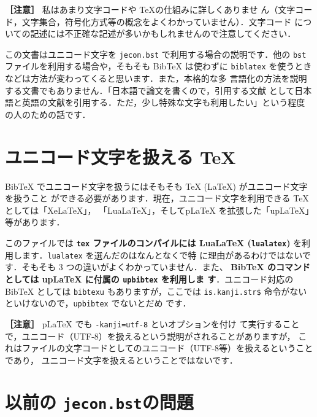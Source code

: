 \documentclass[article]{jlreq}
\begin{document}
\vspace*{1em}

\noindent \textbf{［注意］} 私はあまり文字コードや \TeX の仕組みに詳しくありませ
ん（文字コード，文字集合，符号化方式等の概念をよくわかっていません）．文字コード
についての記述には不正確な記述が多いかもしれませんので注意してください．

\vspace*{1em}

この文書はユニコード文字を \texttt{jecon.bst} で利用する場合の説明です．他の
\texttt{bst} ファイルを利用する場合や，そもそも BibTeX は使わずに
\texttt{biblatex} を使うときなどは方法が変わってくると思います．また，本格的な多
言語化の方法を説明する文書でもありません．「日本語で論文を書くので，引用する文献
として日本語と英語の文献を引用する．ただ，少し特殊な文字も利用したい」という程度
の人のための話です．


\section{ユニコード文字を扱える \TeX}

BibTeX でユニコード文字を扱うにはそもそも TeX (LaTeX) がユニコード文字を扱うこと
ができる必要があります．現在，ユニコード文字を利用できる TeX としては「XeLaTeX」，
「LuaLaTeX」，そしてpLaTeX を拡張した「upLaTeX」等があります．

このファイルでは \textbf{\texttt{tex} ファイルのコンパイルには LuaLaTeX
(\texttt{lualatex}) }を利用します．\texttt{lualatex} を選んだのはなんとなくで特
に理由があるわけではないです．そもそも 3 つの違いがよくわかっていません．また、
\textbf{BibTeX のコマンドとしては upLaTeX に付属の \texttt{upbibtex} を利用しま
す}．ユニコード対応の BibTeX としては \texttt{bibtexu} もありますが，ここでは
\texttt{is.kanji.str\$} 命令がないといけないので，\texttt{upbibtex} でないとだめ
です．

\vspace*{1em}

\noindent \textbf{［注意］} pLaTeX でも \verb|-kanji=utf-8| といオプションを付け
て実行することで，ユニコード（UTF-8）を扱えるという説明がされることがありますが，
これはファイルの文字コードとしてのユニコード（UTF-8等）を扱えるということであり，
ユニコード文字を扱えるということではないです．

\section{以前の \texttt{jecon.bst}の問題}
\label{jecon-problem}
\end{document}
